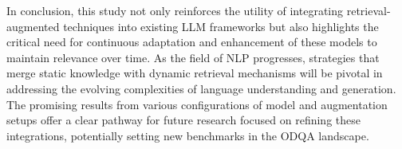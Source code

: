In conclusion, this study not only reinforces the utility of integrating retrieval-augmented techniques into existing LLM frameworks but also highlights the critical need for continuous adaptation and enhancement of these models to maintain relevance over time. As the field of NLP progresses, strategies that merge static knowledge with dynamic retrieval mechanisms will be pivotal in addressing the evolving complexities of language understanding and generation. The promising results from various configurations of model and augmentation setups offer a clear pathway for future research focused on refining these integrations, potentially setting new benchmarks in the ODQA landscape.
